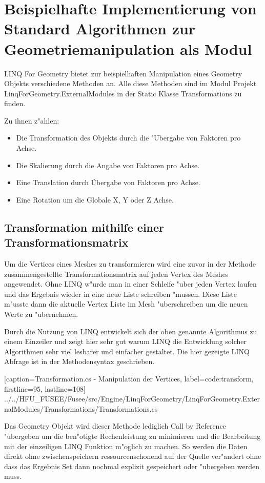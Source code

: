 \documentclass[pagesize, paper=a4, fontsize=12pt,titlepage=true, headings=small, headnosepline, abstractoff, liststotoc, nochapterprefix, plainheadsepline]{scrreprt}
\newcommand{\LFGS}{LINQ For Geometry }
\begin{document}
	\section {Beispielhafte Implementierung von Standard Algorithmen zur Geometriemanipulation als Modul}
	\LFGS bietet zur beispielhaften Manipulation eines Geometry Objekts verschiedene Methoden an. Alle diese Methoden sind im Modul Projekt LinqForGeometry.ExternalModules in der Static Klasse Transformations zu finden.

Zu ihnen z"ahlen:
\begin{itemize}
\item Die Transformation des Objekts durch die "Ubergabe von Faktoren pro Achse.
\item Die Skalierung durch die Angabe von Faktoren pro Achse.
\item Eine Translation durch Übergabe von Faktoren pro Achse.
\item Eine Rotation um die Globale X, Y oder Z Achse.
\end{itemize}

\subsection {Transformation mithilfe einer Transformationsmatrix}
Um die Vertices eines Meshes zu transformieren wird eine zuvor in der Methode zusammengestellte Transformationsmatrix auf jeden Vertex des Meshes angewendet. Ohne LINQ w"urde man in einer Schleife "uber jeden Vertex laufen und das Ergebnis wieder in eine neue Liste schreiben "mussen. Diese Liste m"usste dann die aktuelle Vertex Liste im Mesh "uberschreiben um die neuen Werte zu "ubernehmen.

Durch die Nutzung von LINQ entwickelt sich der oben genannte Algorithmus zu einem Einzeiler und zeigt hier sehr gut warum LINQ die Entwicklung solcher Algorithmen sehr viel lesbarer und einfacher gestaltet. Die hier gezeigte LINQ Abfrage ist in der Methodensyntax geschrieben.

			[caption={Transformation.cs - Manipulation der Vertices}, label=code:transform, firstline=95, lastline=108]
			{../../HFU_FUSEE/Fusee/src/Engine/LinqForGeometry/LinqForGeometry.ExternalModules/Transformations/Transformations.cs}

Das Geometry Objekt wird dieser Methode lediglich Call by Reference "ubergeben um die ben"otigte Rechenleistung zu minimieren und die Bearbeitung mit der einzeiligen LINQ Funktion m"oglich zu machen. So werden die Daten direkt ohne zwischenspeichern ressourcenschonend auf der Quelle ver"andert ohne dass das Ergebnis Set dann nochmal explizit gespeichert oder "ubergeben werden muss.
\end{document}
